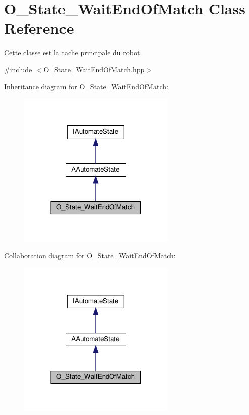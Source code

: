 \hypertarget{classO__State__WaitEndOfMatch}{}\section{O\+\_\+\+State\+\_\+\+Wait\+End\+Of\+Match Class Reference}
\label{classO__State__WaitEndOfMatch}


Cette classe est la tache principale du robot.  




{\ttfamily \#include $<$O\+\_\+\+State\+\_\+\+Wait\+End\+Of\+Match.\+hpp$>$}



Inheritance diagram for O\+\_\+\+State\+\_\+\+Wait\+End\+Of\+Match\+:
\nopagebreak
\begin{figure}[H]
\begin{center}
\leavevmode
\includegraphics[width=213pt]{classO__State__WaitEndOfMatch__inherit__graph}
\end{center}
\end{figure}


Collaboration diagram for O\+\_\+\+State\+\_\+\+Wait\+End\+Of\+Match\+:
\nopagebreak
\begin{figure}[H]
\begin{center}
\leavevmode
\includegraphics[width=213pt]{classO__State__WaitEndOfMatch__coll__graph}
\end{center}
\end{figure}
